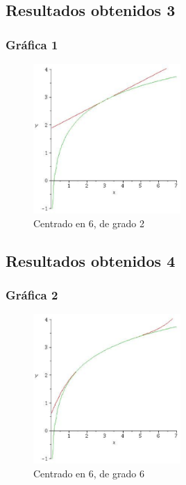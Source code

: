 \documentclass{beamer}
\begin{document}
\subsection{Resultados obtenidos 3}
\begin{frame}
\frametitle{Gráfica 1}
\begin{figure}[htb]
  \begin{center}
     \includegraphics[width=0.5\textwidth]{grafica2.eps}
     \caption{Centrado en 6, de grado 2}
     \label{fig:ejemplo}   
  \end{center}
\end{figure}
\end{frame}


\subsection{Resultados obtenidos 4}
\begin{frame}
\frametitle{Gráfica 2}
\begin{figure}
 \begin{center}
     \includegraphics[width=0.5\textwidth]{grafica6.eps}
     \caption{Centrado en 6, de grado 6}
     \label{fig:ejemplo2}     
 \end{center}
\end{figure}
\end{frame}
\end{document}
